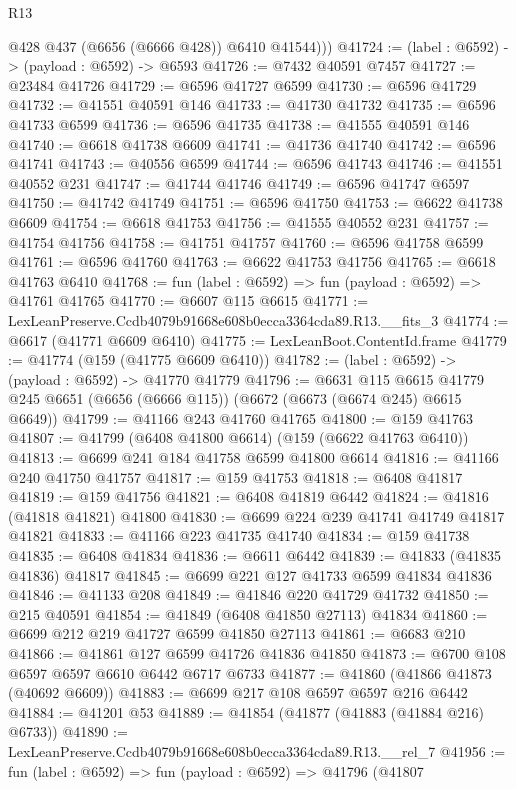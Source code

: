 \begin{lexlean}{R13}
\begin{coremodule}
          @428
          @437
          (@6656 (@6666 @428))
          @6410
          @41544)))
@41724 := (label : @6592) -> (payload : @6592) -> @6593
@41726 := @7432 @40591 @7457
@41727 := @23484 @41726
@41729 := @6596 @41727 @6599
@41730 := @6596 @41729
@41732 := @41551 @40591 @146
@41733 := @41730 @41732
@41735 := @6596 @41733 @6599
@41736 := @6596 @41735
@41738 := @41555 @40591 @146
@41740 := @6618 @41738 @6609
@41741 := @41736 @41740
@41742 := @6596 @41741
@41743 := @40556 @6599
@41744 := @6596 @41743
@41746 := @41551 @40552 @231
@41747 := @41744 @41746
@41749 := @6596 @41747 @6597
@41750 := @41742 @41749
@41751 := @6596 @41750
@41753 := @6622 @41738 @6609
@41754 := @6618 @41753
@41756 := @41555 @40552 @231
@41757 := @41754 @41756
@41758 := @41751 @41757
@41760 := @6596 @41758 @6599
@41761 := @6596 @41760
@41763 := @6622 @41753 @41756
@41765 := @6618 @41763 @6410
@41768 := fun (label : @6592) => fun (payload : @6592) => @41761 @41765
@41770 := @6607 @115 @6615
@41771 := LexLeanPreserve.Ccdb4079b91668e608b0ecca3364cda89.R13.__fits_3
@41774 := @6617 (@41771 @6609 @6410)
@41775 := LexLeanBoot.ContentId.frame
@41779 := @41774 (@159 (@41775 @6609 @6410))
@41782 := (label : @6592) -> (payload : @6592) -> @41770 @41779
@41796 := @6631
    @115
    @6615
    @41779
    @245
    @6651
    (@6656 (@6666 @115))
    (@6672 (@6673 (@6674 @245) @6615 @6649))
@41799 := @41166 @243 @41760 @41765
@41800 := @159 @41763
@41807 := @41799 (@6408 @41800 @6614) (@159 (@6622 @41763 @6410))
@41813 := @6699 @241 @184 @41758 @6599 @41800 @6614
@41816 := @41166 @240 @41750 @41757
@41817 := @159 @41753
@41818 := @6408 @41817
@41819 := @159 @41756
@41821 := @6408 @41819 @6442
@41824 := @41816 (@41818 @41821) @41800
@41830 := @6699 @224 @239 @41741 @41749 @41817 @41821
@41833 := @41166 @223 @41735 @41740
@41834 := @159 @41738
@41835 := @6408 @41834
@41836 := @6611 @6442
@41839 := @41833 (@41835 @41836) @41817
@41845 := @6699 @221 @127 @41733 @6599 @41834 @41836
@41846 := @41133 @208
@41849 := @41846 @220 @41729 @41732
@41850 := @215 @40591
@41854 := @41849 (@6408 @41850 @27113) @41834
@41860 := @6699 @212 @219 @41727 @6599 @41850 @27113
@41861 := @6683 @210
@41866 := @41861 @127 @6599 @41726 @41836 @41850
@41873 := @6700 @108 @6597 @6597 @6610 @6442 @6717 @6733
@41877 := @41860 (@41866 @41873 (@40692 @6609))
@41883 := @6699 @217 @108 @6597 @6597 @216 @6442
@41884 := @41201 @53
@41889 := @41854 (@41877 (@41883 (@41884 @216) @6733))
@41890 := LexLeanPreserve.Ccdb4079b91668e608b0ecca3364cda89.R13.__rel_7
@41956 := fun (label : @6592) =>
  fun (payload : @6592) =>
  @41796
    (@41807

\end{coremodule}
\end{lexlean}

